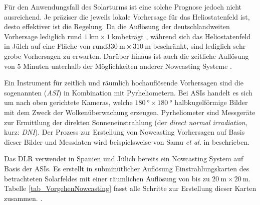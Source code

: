 Für den Anwendungsfall des Solarturms ist eine solche Prognose jedoch nicht ausreichend.
Je präziser die jeweils lokale Vorhersage für das Heliostatenfeld ist, desto effektiver ist die Regelung.
Da die Auflösung der deutschlandweiten Vorhersage lediglich rund $\SI{1}{\kilo\metre} \times \SI{1}{\kilo\metre}$\linebreak beträgt \cite{DWD1}\cite{DWD2}, während sich das Heliostatenfeld in Jülch auf eine Fläche von rund\linebreak $\SI{330}{\metre} \times \SI{310}{\metre}$ beschränkt, sind lediglich sehr grobe Vorhersagen zu erwarten.
Darüber hinaus ist auch die zeitliche Auflösung von 5 Minuten \cite{DWD2} unterhalb der Möglichkeiten anderer Nowcasting Systeme \cite{DLRNowcasting}\cite[S.272]{QuesadaRuiz}.

Ein Instrument für zeitlich und räumlich hochauflösende Vorhersagen sind die sogenannten  (\textit{ASI}) in Kombination mit Pyrheliometern.
Bei ASIs handelt es sich um nach oben gerichtete Kameras, welche $\SI{180}{\degree} \times \SI{180}{\degree}$ halbkugelförmige Bilder mit dem Zweck der Wolkenüberwachung erzeugen.
Pyrheliometer sind Messgeräte zur Ermittlung der direkten Sonneneinstrahlung (der \textit{direct normal irradiation}, kurz: \textit{DNI}).
Der Prozess zur Erstellung von Nowcasting Vorhersagen auf Basis dieser Bilder und Messdaten wird beispielsweise von Samu \textit{et al.} in \cite{Samu} beschrieben.

Das DLR verwendet in Spanien und Jülich bereits ein Nowcasting System auf Basis der ASIs.
Es erstellt in subminütlicher Auflösung Einstrahlungskarten des betrachteten Solarfeldes mit einer räumlichen Auflösung von bis zu $\SI{20}{\metre} \times \SI{20}{\metre}$.
Tabelle \ref{tab_VorgehenNowcasting} fasst alle Schritte zur Erstellung dieser Karten zusammen. \cite[S.4,S.13]{Samu}\cite{DLRNowcasting}.

